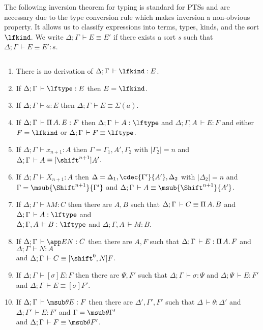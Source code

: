 \documentclass[copyright,creativecommons]{eptcs}
\newcommand{\bla}{\ensuremath{\mbox{$$}}} \newcommand{\Fpure}{\ensuremath{\mathsf{F}}}
\newcommand{\der}{\,\vdash}
\newcommand{\length}[1]{|#1|}
\newcommand{\shiftby}[1]{\shift^{#1}}
\newcommand{\Shiftby}[1]{\Shift^{#1}}
\newcommand{\esub}[1]{[#1]}
\newcommand{\sgsub}[1]{\esub{\shiftby 0,#1}}
\begin{document}
The following inversion theorem for typing is standard for PTSs and
are necessary due to the type conversion rule which makes inversion a
non-obvious property.  It allows us to classify expressions into terms,
types, kinds, and the sort $\lfkind$.  
We write $\Delta;\Gamma \der E \equiv E'$ if there exists a sort $s$
such that $\Delta;\Gamma \der E \equiv E' : s$.
\begin{theorem} \label{thm:inv} \bla
\begin{enumerate}
\item There is no derivation of $\Delta;\Gamma \der \lfkind : E$.
\item If $\Delta;\Gamma \der \lftype : E$ then $E = \lfkind$.      
\item If $\Delta;\Gamma \der a : E$ then $\Delta;\Gamma \der E \equiv
  \Sigma(a)$.
\item If $\Delta;\Gamma \der \fun A E : F$ then 
   $\Delta;\Gamma \der A : \lftype$ and $\Delta; \Gamma,A \der E : F$ and 
   either $F = \lfkind$ or $\Delta; \Gamma \der F \equiv \lftype$. \item If $\Delta;\Gamma \der x_{n+1} : A$ then $\Gamma =
  \Gamma_1,A',\Gamma_2$ with $\length{\Gamma_2} = n$ and
  $\Delta;\Gamma \der A \equiv \esub{\shiftby {n+1}} {A'}$. \item If $\Delta; \Gamma \der X_{n+1} : A$ then $\Delta =
  \Delta_1,\cdec{\Gamma'}{A'},\Delta_2$ with $\length{\Delta_2} = n$ and
  $\Gamma = \msub{\Shiftby{n+1}}{\Gamma'}$ and
  $\Delta;\Gamma \der A \equiv \msub{\Shiftby {n+1}} {A'}$.\item If $\Delta; \Gamma \der \lambda M : C$ then there are $A,B$ such
  that $\Delta; \Gamma \der C \equiv \fun A B$ and
  $\Delta; \Gamma \der A : \lftype$ and \\$\Delta; \Gamma, A \der B : \lftype$ 
  and
  $\Delta; \Gamma, A \der M : B$.
\item If $\Delta; \Gamma \der \app E N : C$ then there are $A,F$ such
  that $\Delta; \Gamma \der E : \fun A F$ and 
  $\Delta; \Gamma \der N : A$ \\and
  $\Delta; \Gamma \der C \equiv \sgsub N F$. 
\item If $\Delta; \Gamma \der \esub \sigma E : F$ then there are $\Psi,{F'}$
  such that $\Delta; \Gamma \der \sigma : \Psi$ and $\Delta; \Psi \der
  E : {F'}$ \\ and $\Delta; \Gamma \der E \equiv \esub \sigma {F'}$.
\item If $\Delta; \Gamma \der \msub \theta E : F$ then there are
  $\Delta',\Gamma', {F'}$
  such that $\Delta \der \theta : \Delta'$ and 
  $\Delta; \Gamma' \der E : {F'}$ and 
  $\Gamma = \msub \theta {\Gamma'}$ \\and 
  $\Delta; \Gamma \der F \equiv \msub \theta {F'}$. 
\end{enumerate}
\end{theorem}
\end{document}
